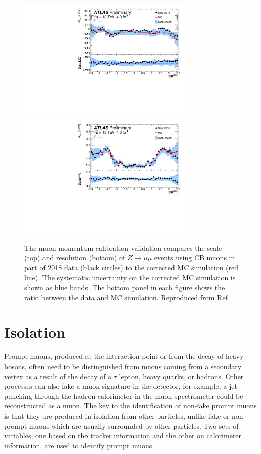 \begin{figure}[h!]
  \centering
  \includegraphics[width=0.75\textwidth]{figures/muons/scale} \
  \includegraphics[width=0.75\textwidth]{figures/muons/reso}
  \caption[Muon momentum calibration validation]{The muon momentum calibration
  validation compares the scale (top) and resolution (bottom)
  of $Z\rightarrow\mu\mu$ events using CB muons in part of
  2018 data (black circles) to the corrected MC simulation
  (red line). The systematic uncertainty on the corrected MC
  simulation is shown as blue bands. The bottom panel in each
  figure shows the ratio between the data and MC simulation.
  Reproduced from Ref. \cite{Barone:2320120}.}
  \label{fig:muon:calibration}
\end{figure}

\section{Isolation}

Prompt muons, produced at the interaction point or from the decay of heavy
bosons, often need to be distinguished from muons coming from a secondary
vertex as a result of the decay of a $\tau$ lepton, heavy quarks, or
hadrons. Other processes can also fake a muon signature in the detector,
for example, a jet punching through the hadron calorimeter in the muon
spectrometer could be reconstructed as a muon. The key to the identification
of non-fake prompt muons is that they are produced in isolation from
other particles, unlike fake or non-prompt muons which are usually
surrounded by other particles. Two sets of variables, one based
on the tracker information and the other on calorimeter information, are
used to identify prompt muons.

